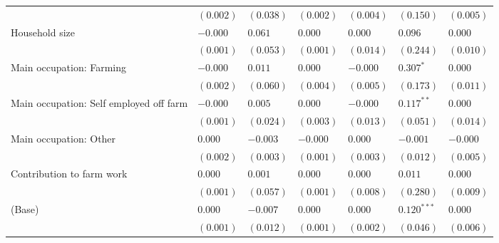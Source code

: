 \begin{tabular}{lllllll}
                                        &   $(0.002)$ &        $(0.038)$ &    $(0.002)$ &     $(0.004)$ &        $(0.150)$ &     $(0.005)$ \\
Household size                          &    $-0.000$ &          $0.061$ &      $0.000$ &       $0.000$ &          $0.096$ &       $0.000$ \\
                                        &   $(0.001)$ &        $(0.053)$ &    $(0.001)$ &     $(0.014)$ &        $(0.244)$ &     $(0.010)$ \\
Main occupation: Farming                &    $-0.000$ &          $0.011$ &      $0.000$ &      $-0.000$ &     $0.307 ^{*}$ &       $0.000$ \\
                                        &   $(0.002)$ &        $(0.060)$ &    $(0.004)$ &     $(0.005)$ &        $(0.173)$ &     $(0.011)$ \\
Main occupation: Self employed off farm &    $-0.000$ &          $0.005$ &      $0.000$ &      $-0.000$ &    $0.117 ^{**}$ &       $0.000$ \\
                                        &   $(0.001)$ &        $(0.024)$ &    $(0.003)$ &     $(0.013)$ &        $(0.051)$ &     $(0.014)$ \\
Main occupation: Other                  &     $0.000$ &         $-0.003$ &     $-0.000$ &       $0.000$ &         $-0.001$ &      $-0.000$ \\
                                        &   $(0.002)$ &        $(0.003)$ &    $(0.001)$ &     $(0.003)$ &        $(0.012)$ &     $(0.005)$ \\
Contribution to farm work               &     $0.000$ &          $0.001$ &      $0.000$ &       $0.000$ &          $0.011$ &       $0.000$ \\
                                        &   $(0.001)$ &        $(0.057)$ &    $(0.001)$ &     $(0.008)$ &        $(0.280)$ &     $(0.009)$ \\
(Base)                                  &     $0.000$ &         $-0.007$ &      $0.000$ &       $0.000$ &   $0.120 ^{***}$ &       $0.000$ \\
                                        &   $(0.001)$ &        $(0.012)$ &    $(0.001)$ &     $(0.002)$ &        $(0.046)$ &     $(0.006)$ \\
\bottomrule
\end{tabular}
